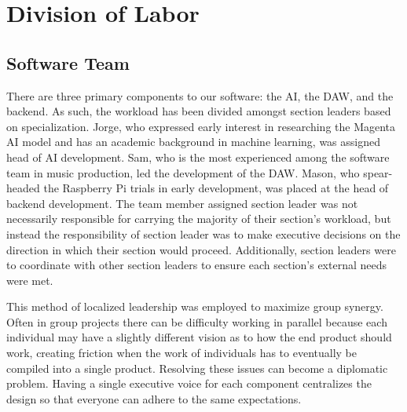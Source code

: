 \section{Division of Labor}

\subsection{Software Team}

There are three primary components to our software: the AI, the DAW, and the backend. As such, the
workload has been divided amongst section leaders based on specialization. Jorge, who expressed
early interest in researching the Magenta AI model and has an academic background in machine
learning, was assigned head of AI development. Sam, who is the most experienced among the software
team in music production, led the development of the DAW. Mason, who spear-headed the Raspberry Pi
trials in early development, was placed at the head of backend development. The team member
assigned section leader was not necessarily responsible for carrying the majority of their
section's workload, but instead the responsibility of section leader was to make executive
decisions on the direction in which their section would proceed. Additionally, section leaders
were to coordinate with other section leaders to ensure each section's external needs were met.

This method of localized leadership was employed to maximize group synergy. Often in group
projects there can be difficulty working in parallel because each individual may have a slightly
different vision as to how the end product should work, creating friction when the work of
individuals has to eventually be compiled into a single product. Resolving these issues can become
a diplomatic problem. Having a single executive voice for each component centralizes the design
so that everyone can adhere to the same expectations.
